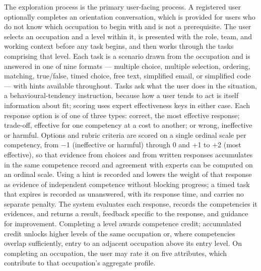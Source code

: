 The exploration process is the primary user-facing process. A registered user optionally completes an orientation conversation, which is provided for users who do not know which occupation to begin with and is not a prerequisite. The user selects an occupation and a level within it, is presented with the role, team, and working context before any task begins, and then works through the tasks comprising that level. Each task is a scenario drawn from the occupation and is answered in one of nine formats --- multiple choice, multiple selection, ordering, matching, true/false, timed choice, free text, simplified email, or simplified code --- with hints available throughout. Tasks ask what the user does in the situation, a behavioural-tendency instruction\cite{r28}, because how a user tends to act is itself information about fit; scoring uses expert effectiveness keys in either case. Each response option is of one of three types: correct, the most effective response; trade-off, effective for one competency at a cost to another; or wrong, ineffective or harmful. Options and rubric criteria are scored on a single ordinal scale per competency, from $-$1 (ineffective or harmful) through 0 and +1 to +2 (most effective), so that evidence from choices and from written responses accumulates in the same competence record and agreement with experts can be computed on an ordinal scale. Using a hint is recorded and lowers the weight of that response as evidence of independent competence without blocking progress; a timed task that expires is recorded as unanswered, with its response time, and carries no separate penalty. The system evaluates each response, records the competencies it evidences, and returns a result, feedback specific to the response, and guidance for improvement. Completing a level awards competence credit; accumulated credit unlocks higher levels of the same occupation or, where competencies overlap sufficiently, entry to an adjacent occupation above its entry level. On completing an occupation, the user may rate it on five attributes, which contribute to that occupation's aggregate profile.

